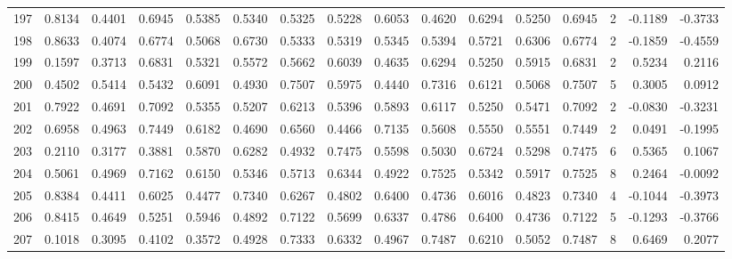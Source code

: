 \begin{tabular}{lrrrrrrrrrrrrrrr}
197 &      0.8134 &  0.4401 &  0.6945 &  0.5385 &  0.5340 &  0.5325 &  0.5228 &  0.6053 &  0.4620 &  0.6294 &   0.5250 &     0.6945 &      2 &                   -0.1189 &                    -0.3733 \\
198 &      0.8633 &  0.4074 &  0.6774 &  0.5068 &  0.6730 &  0.5333 &  0.5319 &  0.5345 &  0.5394 &  0.5721 &   0.6306 &     0.6774 &      2 &                   -0.1859 &                    -0.4559 \\
199 &      0.1597 &  0.3713 &  0.6831 &  0.5321 &  0.5572 &  0.5662 &  0.6039 &  0.4635 &  0.6294 &  0.5250 &   0.5915 &     0.6831 &      2 &                    0.5234 &                     0.2116 \\
200 &      0.4502 &  0.5414 &  0.5432 &  0.6091 &  0.4930 &  0.7507 &  0.5975 &  0.4440 &  0.7316 &  0.6121 &   0.5068 &     0.7507 &      5 &                    0.3005 &                     0.0912 \\
201 &      0.7922 &  0.4691 &  0.7092 &  0.5355 &  0.5207 &  0.6213 &  0.5396 &  0.5893 &  0.6117 &  0.5250 &   0.5471 &     0.7092 &      2 &                   -0.0830 &                    -0.3231 \\
202 &      0.6958 &  0.4963 &  0.7449 &  0.6182 &  0.4690 &  0.6560 &  0.4466 &  0.7135 &  0.5608 &  0.5550 &   0.5551 &     0.7449 &      2 &                    0.0491 &                    -0.1995 \\
203 &      0.2110 &  0.3177 &  0.3881 &  0.5870 &  0.6282 &  0.4932 &  0.7475 &  0.5598 &  0.5030 &  0.6724 &   0.5298 &     0.7475 &      6 &                    0.5365 &                     0.1067 \\
204 &      0.5061 &  0.4969 &  0.7162 &  0.6150 &  0.5346 &  0.5713 &  0.6344 &  0.4922 &  0.7525 &  0.5342 &   0.5917 &     0.7525 &      8 &                    0.2464 &                    -0.0092 \\
205 &      0.8384 &  0.4411 &  0.6025 &  0.4477 &  0.7340 &  0.6267 &  0.4802 &  0.6400 &  0.4736 &  0.6016 &   0.4823 &     0.7340 &      4 &                   -0.1044 &                    -0.3973 \\
206 &      0.8415 &  0.4649 &  0.5251 &  0.5946 &  0.4892 &  0.7122 &  0.5699 &  0.6337 &  0.4786 &  0.6400 &   0.4736 &     0.7122 &      5 &                   -0.1293 &                    -0.3766 \\
207 &      0.1018 &  0.3095 &  0.4102 &  0.3572 &  0.4928 &  0.7333 &  0.6332 &  0.4967 &  0.7487 &  0.6210 &   0.5052 &     0.7487 &      8 &                    0.6469 &                     0.2077 \\

\end{tabular}

